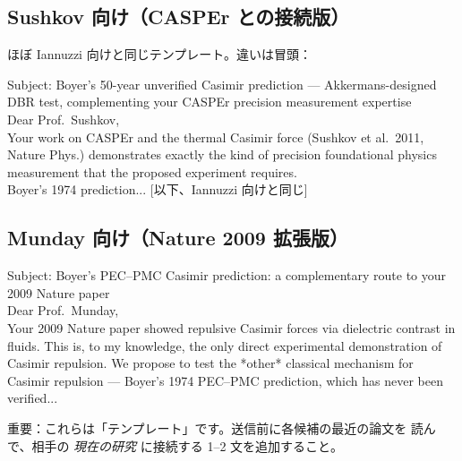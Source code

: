 \documentclass[11pt,a4paper]{article}
\def\textbf#1{#1}%
\begin{document}
\subsection{Sushkov 向け（CASPEr との接続版）}

ほぼ Iannuzzi 向けと同じテンプレート。違いは冒頭：

\begin{tcolorbox}[colback=white,colframe=blue!50!black,breakable]
\small\ttfamily
Subject: Boyer's 50-year unverified Casimir prediction --- Akkermans-designed
DBR test, complementing your CASPEr precision measurement expertise\\

Dear Prof.\ Sushkov,\\

Your work on CASPEr and the thermal Casimir force (Sushkov et al.\ 2011,
Nature Phys.) demonstrates exactly the kind of precision foundational
physics measurement that the proposed experiment requires.\\

Boyer's 1974 prediction... [以下、Iannuzzi 向けと同じ]
\end{tcolorbox}

\subsection{Munday 向け（Nature 2009 拡張版）}

\begin{tcolorbox}[colback=white,colframe=blue!50!black,breakable]
\small\ttfamily
Subject: Boyer's PEC--PMC Casimir prediction: a complementary route to
your 2009 Nature paper\\

Dear Prof.\ Munday,\\

Your 2009 Nature paper showed repulsive Casimir forces via dielectric
contrast in fluids. This is, to my knowledge, the only direct experimental
demonstration of Casimir repulsion. We propose to test the *other*
classical mechanism for Casimir repulsion --- Boyer's 1974 PEC--PMC
prediction, which has never been verified...\\
\end{tcolorbox}

\textbf{重要}：これらは「テンプレート」です。送信前に各候補の最近の論文を
読んで、相手の \emph{現在の研究} に接続する 1--2 文を追加すること。

\newpage

\end{document}

